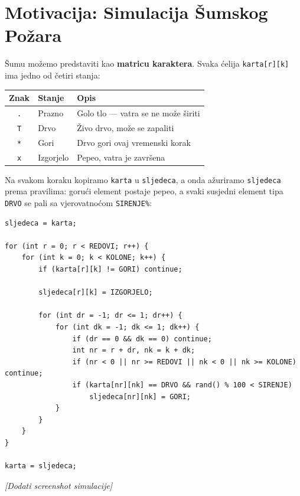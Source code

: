 \documentclass[11pt]{article}
\begin{document}
\section*{Motivacija: Simulacija Šumskog Požara}

Šumu možemo predstaviti kao \textbf{matricu karaktera}. Svaka ćelija
\texttt{karta[r][k]} ima jedno od četiri stanja:

\begin{center}
\begin{tabular}{@{} c l l @{}}
    \toprule
    \textbf{Znak} & \textbf{Stanje} & \textbf{Opis} \\
    \midrule
    \texttt{.} & Prazno     & Golo tlo — vatra se ne može širiti \\
    \texttt{T} & Drvo       & Živo drvo, može se zapaliti \\
    \texttt{*} & Gori       & Drvo gori ovaj vremenski korak \\
    \texttt{x} & Izgorjelo  & Pepeo, vatra je završena \\
    \bottomrule
\end{tabular}
\end{center}

Na svakom koraku kopiramo \texttt{karta} u \texttt{sljedeca}, a onda
ažuriramo \texttt{sljedeca} prema pravilima: gorući element postaje pepeo,
a svaki susjedni element tipa \texttt{DRVO} se pali sa vjerovatnoćom
\texttt{SIRENJE\%}:

\begin{lstlisting}
sljedeca = karta;

for (int r = 0; r < REDOVI; r++) {
    for (int k = 0; k < KOLONE; k++) {
        if (karta[r][k] != GORI) continue;

        sljedeca[r][k] = IZGORJELO;

        for (int dr = -1; dr <= 1; dr++) {
            for (int dk = -1; dk <= 1; dk++) {
                if (dr == 0 && dk == 0) continue;
                int nr = r + dr, nk = k + dk;
                if (nr < 0 || nr >= REDOVI || nk < 0 || nk >= KOLONE) continue;
                if (karta[nr][nk] == DRVO && rand() % 100 < SIRENJE)
                    sljedeca[nr][nk] = GORI;
            }
        }
    }
}

karta = sljedeca;
\end{lstlisting}

\begin{mdframed}[linecolor=gray!35, linewidth=0.6pt, backgroundcolor=gray!4,
                 innertopmargin=55pt, innerbottommargin=55pt]
    \centering\color{gray}\small\textit{[Dodati screenshot simulacije]}
\end{mdframed}
\end{document}
